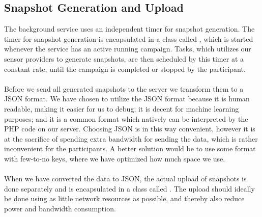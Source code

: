 \subsection{Snapshot Generation and Upload}
\label{sub:background_sensor_service_snapshot_generation_and_upload}


The background service uses an independent timer for snapshot generation. The timer for snapshot generation is encapsulated in a class called , which is started whenever the service has an active running campaign. Tasks, which utilizes our sensor providers to generate snapshots, are then scheduled by this timer at a constant rate, until the campaign is completed or stopped by the participant.
\\\\
Before we send all generated snapshots to the server we transform them to a JSON format. We have chosen to utilize the JSON format because it is human readable, making it easier for us to debug; it is decent for machine learning purposes; and it is a common format which natively can be interpreted by the PHP code on our server. Choosing JSON is in this way convenient, however it is at the sacrifice of spending extra bandwidth for sending the data, which is rather inconvenient for the participants. A better solution would be to use some format with few-to-no keys, where we have optimized how much space we use. 
\\\\
When we have converted the data to JSON, the actual upload of snapshots is done separately and is encapsulated in a class called . The upload should ideally be done using as little network resources as possible, and thereby also reduce power and bandwidth consumption. 
\\\\
